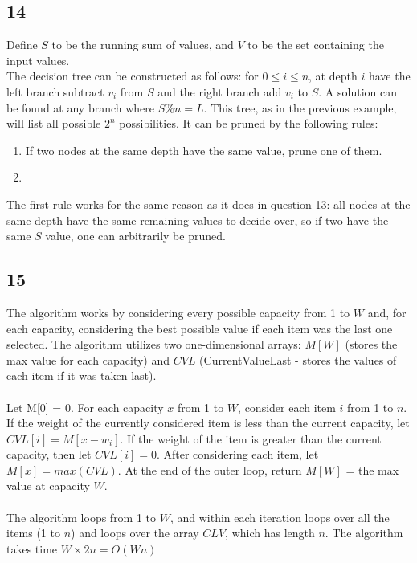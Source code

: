 \documentclass[letterpaper,notitlepage,twoside]{article}
\begin{document}
\subsection*{14}
Define $S$ to be the running sum of values, and $V$ to be the set containing the input values. \\
The decision tree can be constructed as follows: for $0\leq i \leq n$, at depth $i$ have the left branch subtract $v_i$ from $S$ and the right branch add $v_i$ to $S$. A solution can be found at any branch where $S\% n = L$. This tree, as in the previous example, will list all possible $2^n$ possibilities. It can be pruned by the following rules:   
\begin{enumerate}
\item If two nodes at the same depth have the same value, prune one of them. 
\item
\end{enumerate}
The first rule works for the same reason as it does in question 13: all nodes at the same depth have the same remaining values to decide over, so if two have the same $S$ value, one can arbitrarily be pruned. 

\subsection*{15}
The algorithm works by considering every possible capacity from 1 to $W$ and, for each capacity, considering the best possible value if each item was the last one selected. The algorithm utilizes two one-dimensional arrays: $M[W]$ (stores the max value for each capacity) and $CVL$ (CurrentValueLast - stores the values of each item if it was taken last). \\ \\
Let M[0] = 0. For each capacity $x$ from 1 to $W$, consider each item $i$ from 1 to $n$. If the weight of the currently considered item is less than the current capacity, let $CVL[i] = M[x - w_i]$. If the weight of the item is greater than the current capacity, then let $CVL[i] = 0$. After considering each item, let $M[x] = max(CVL)$. At the end of the outer loop, return $M[W]$ = the max value at capacity $W$. \\ \\
The algorithm loops from 1 to $W$, and within each iteration loops over all the items (1 to $n$) and loops over the array $CLV$, which has length $n$. The algorithm takes time $W \times 2n = O(Wn)$
\end{document}

